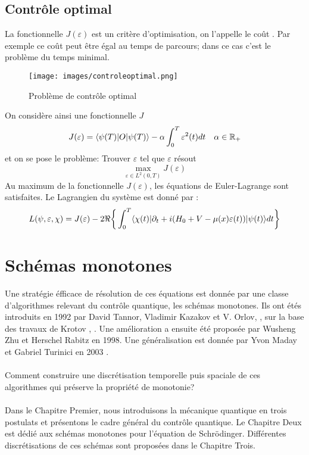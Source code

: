 \subsection*{Contrôle optimal}
La fonctionnelle $J(\varepsilon)$ est un critère d’optimisation, on l’appelle le coût . Par exemple ce coût
peut être égal au temps de parcours; dans ce cas c’est le problème du temps minimal.
\begin{figure}[h]
	\caption{Problème de contrôle optimal}
	\centering
	\texttt{[image: images/controleoptimal.png]}
\end{figure}

On considère ainsi une fonctionnelle $J$
\begin{equation}
J(\varepsilon) = \langle \psi(T)|O|\psi(T) \rangle - \alpha \int_{0}^{T}\varepsilon^2(t)dt \quad \alpha \in \mathbb R_+
\end{equation}
et on se pose le problème: Trouver $\varepsilon$ tel que $\varepsilon$ résout
$$ \max_{\varepsilon \in L^2(0,T)} J(\varepsilon)$$
Au maximum de la fonctionnelle $J(\varepsilon)$, les équations de Euler-Lagrange sont satisfaites. Le Lagrangien du système est donné par :
\begin{equation} \label{lagrangien}
L(\psi,\varepsilon,\chi)= J(\varepsilon)\\
-2\Re \bigg\{ \int_{0}^{T}\langle \chi (t)|\partial_{t}+i(H_0+V-\mu(x)\varepsilon(t))|\psi(t) \rangle dt \bigg\}
\end{equation}
\section*{Schémas monotones}
Une stratégie éfficace de résolution de ces équations est donnée par une classe d’algorithmes relevant du contrôle quantique, les schémas monotones. Ils ont étés introduits en 1992 par David Tannor, Vladimir Kazakov et V. Orlov,  \cite{Tannor}, sur la base des travaux de Krotov \cite{Krotov1}, \cite{Krotov2}. Une amélioration a ensuite été proposée par Wusheng Zhu et Herschel Rabitz \cite{Zhu} en 1998. Une généralisation est donnée par Yvon Maday et Gabriel Turinici en 2003 \cite{Maday}.\\\\

Comment construire une discrétisation temporelle puis spaciale de ces algorithmes qui préserve la propriété de monotonie?\\\\

Dans le Chapitre Premier, nous introduisons la mécanique quantique en trois postulats et présentons le cadre général du contrôle quantique. Le Chapitre Deux est dédié aux schémas monotones pour l'équation de Schrödinger.
Différentes discrétisations de ces schémas sont proposées dans le Chapitre Trois.